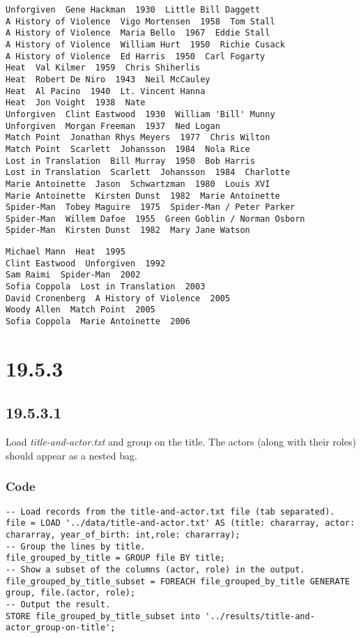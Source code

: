 \documentclass[a4paper, notitlepage]{article}
\begin{document}
\begin{lstlisting}
Unforgiven  Gene Hackman  1930  Little Bill Daggett
A History of Violence  Vigo Mortensen  1958  Tom Stall
A History of Violence  Maria Bello  1967  Eddie Stall
A History of Violence  William Hurt  1950  Richie Cusack
A History of Violence  Ed Harris  1950  Carl Fogarty
Heat  Val Kilmer  1959  Chris Shiherlis
Heat  Robert De Niro  1943  Neil McCauley
Heat  Al Pacino  1940  Lt. Vincent Hanna
Heat  Jon Voight  1938  Nate
Unforgiven  Clint Eastwood  1930  William 'Bill' Munny
Unforgiven  Morgan Freeman  1937  Ned Logan
Match Point  Jonathan Rhys Meyers  1977  Chris Wilton
Match Point  Scarlett  Johansson  1984  Nola Rice
Lost in Translation  Bill Murray  1950  Bob Harris
Lost in Translation  Scarlett  Johansson  1984  Charlotte
Marie Antoinette  Jason  Schwartzman  1980  Louis XVI
Marie Antoinette  Kirsten Dunst  1982  Marie Antoinette
Spider-Man  Tobey Maguire  1975  Spider-Man / Peter Parker
Spider-Man  Willem Dafoe  1955  Green Goblin / Norman Osborn
Spider-Man  Kirsten Dunst  1982  Mary Jane Watson
\end{lstlisting}

\begin{lstlisting}
Michael Mann  Heat  1995
Clint Eastwood  Unforgiven  1992
Sam Raimi  Spider-Man  2002
Sofia Coppola  Lost in Translation  2003
David Cronenberg  A History of Violence  2005
Woody Allen  Match Point  2005
Sofia Coppola  Marie Antoinette  2006
\end{lstlisting}

\section{19.5.3}

\subsection{19.5.3.1}

Load \textit{title-and-actor.txt} and group on the title. The actors (along with their roles) should appear as a nested bag.

\subsubsection{Code}

\begin{lstlisting}
-- Load records from the title-and-actor.txt file (tab separated).
file = LOAD '../data/title-and-actor.txt' AS (title: chararray, actor: chararray, year_of_birth: int,role: chararray);
-- Group the lines by title.
file_grouped_by_title = GROUP file BY title;
-- Show a subset of the columns (actor, role) in the output.
file_grouped_by_title_subset = FOREACH file_grouped_by_title GENERATE group, file.(actor, role);
-- Output the result.
STORE file_grouped_by_title_subset into '../results/title-and-actor_group-on-title';
\end{lstlisting}
\end{document}
